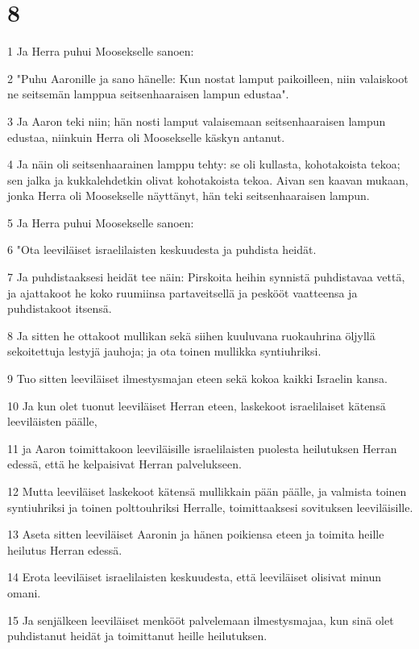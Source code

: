 \chapter{8}

\par 1 Ja Herra puhui Moosekselle sanoen:
\par 2 "Puhu Aaronille ja sano hänelle: Kun nostat lamput paikoilleen, niin valaiskoot ne seitsemän lamppua seitsenhaaraisen lampun edustaa".
\par 3 Ja Aaron teki niin; hän nosti lamput valaisemaan seitsenhaaraisen lampun edustaa, niinkuin Herra oli Moosekselle käskyn antanut.
\par 4 Ja näin oli seitsenhaarainen lamppu tehty: se oli kullasta, kohotakoista tekoa; sen jalka ja kukkalehdetkin olivat kohotakoista tekoa. Aivan sen kaavan mukaan, jonka Herra oli Moosekselle näyttänyt, hän teki seitsenhaaraisen lampun.
\par 5 Ja Herra puhui Moosekselle sanoen:
\par 6 "Ota leeviläiset israelilaisten keskuudesta ja puhdista heidät.
\par 7 Ja puhdistaaksesi heidät tee näin: Pirskoita heihin synnistä puhdistavaa vettä, ja ajattakoot he koko ruumiinsa partaveitsellä ja peskööt vaatteensa ja puhdistakoot itsensä.
\par 8 Ja sitten he ottakoot mullikan sekä siihen kuuluvana ruokauhrina öljyllä sekoitettuja lestyjä jauhoja; ja ota toinen mullikka syntiuhriksi.
\par 9 Tuo sitten leeviläiset ilmestysmajan eteen sekä kokoa kaikki Israelin kansa.
\par 10 Ja kun olet tuonut leeviläiset Herran eteen, laskekoot israelilaiset kätensä leeviläisten päälle,
\par 11 ja Aaron toimittakoon leeviläisille israelilaisten puolesta heilutuksen Herran edessä, että he kelpaisivat Herran palvelukseen.
\par 12 Mutta leeviläiset laskekoot kätensä mullikkain pään päälle, ja valmista toinen syntiuhriksi ja toinen polttouhriksi Herralle, toimittaaksesi sovituksen leeviläisille.
\par 13 Aseta sitten leeviläiset Aaronin ja hänen poikiensa eteen ja toimita heille heilutus Herran edessä.
\par 14 Erota leeviläiset israelilaisten keskuudesta, että leeviläiset olisivat minun omani.
\par 15 Ja senjälkeen leeviläiset menkööt palvelemaan ilmestysmajaa, kun sinä olet puhdistanut heidät ja toimittanut heille heilutuksen.
